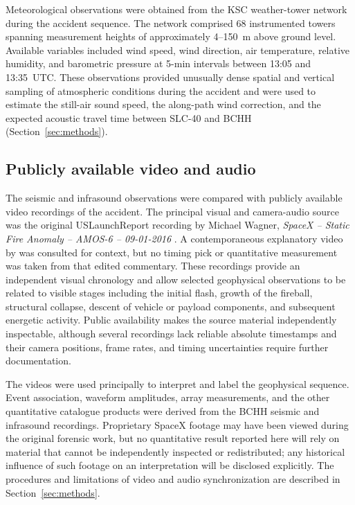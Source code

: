 \documentclass[]{seismica}
\begin{document}
Meteorological observations were obtained from the KSC weather-tower network
during the accident sequence. The network comprised 68 instrumented towers
spanning measurement heights of approximately 4--150~m above ground level.
Available variables included wind speed, wind direction, air temperature,
relative humidity, and barometric pressure at 5-min intervals between 13:05
and 13:35~UTC. These observations provided unusually dense spatial and vertical
sampling of atmospheric conditions during the accident and were used to
estimate the still-air sound speed, the along-path wind correction, and the
expected acoustic travel time between SLC-40 and BCHH
(Section~\ref{sec:methods}).


\subsection{Publicly available video and audio}

The seismic and infrasound observations were compared with publicly available
video recordings of the accident. The principal visual and camera-audio source
was the original USLaunchReport recording by Michael Wagner,
\emph{SpaceX -- Static Fire Anomaly -- AMOS-6 -- 09-01-2016}
\citep{uslaunchreport_amos6_video_2016}. A contemporaneous explanatory video by
\citet{manley_spacex_explosion_2016} was consulted for context, but no timing
pick or quantitative measurement was taken from that edited commentary.
These recordings provide an independent
visual chronology and allow selected geophysical observations to be related to
visible stages including the initial flash, growth of the fireball, structural
collapse, descent of vehicle or payload components, and subsequent energetic
activity. Public availability makes the source material independently
inspectable, although several recordings lack reliable absolute timestamps and
their camera positions, frame rates, and timing uncertainties require further
documentation.

The videos were used principally to interpret and label the geophysical
sequence. Event association, waveform amplitudes, array measurements, and the
other quantitative catalogue products were derived from the BCHH seismic and
infrasound recordings. Proprietary SpaceX footage may have been viewed during
the original forensic work, but no quantitative result reported here will rely
on material that cannot be independently inspected or redistributed; any
historical influence of such footage on an interpretation will be disclosed
explicitly. The procedures and limitations of video and audio
synchronization are described in Section~\ref{sec:methods}.
\end{document}
